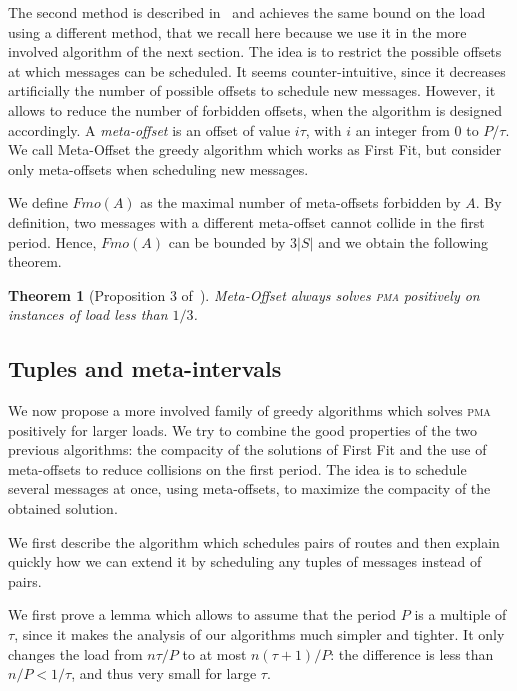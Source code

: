 \documentclass[10pt, conference, letterpaper]{IEEEtran}
\newtheorem{theorem}{Theorem}
\newcommand\pma{\textsc{pma}\xspace}
\begin{document}
The second method is described  in~\cite{dominique2018deterministic} and achieves the same bound on the load using a different method, that we recall here because we use it in the more involved algorithm of the next section.
The idea is to restrict the possible offsets at which messages can be scheduled. It seems counter-intuitive, since it decreases artificially the number of possible offsets to schedule new messages. However, it allows to reduce the number of forbidden offsets, when the algorithm is designed accordingly. A \emph{meta-offset} is an offset of value $i\tau$,
with $i$ an integer from $0$ to $P / \tau$. We call Meta-Offset the greedy algorithm
which works as First Fit, but consider only meta-offsets when scheduling new messages. 

We define $Fmo(A)$ as the maximal number of meta-offsets forbidden by $A$. 
 By definition, two messages with a different meta-offset cannot collide in the first period.
Hence, $Fmo(A)$ can be bounded by $3|S|$ and we obtain the following theorem.


\begin{theorem}[Proposition 3 of~\cite{dominique2018deterministic}]
Meta-Offset always solves \pma positively on instances of load less than $1/3$.
\end{theorem}

\subsection{Tuples and meta-intervals}

We now propose a more involved family of greedy algorithms which 
solves \pma positively for larger loads. We try to combine the good properties of the two previous algorithms: the compacity of the solutions of First Fit and the use of meta-offsets to reduce collisions on the first period. The idea is to schedule several messages at once, using meta-offsets, to maximize the compacity of the obtained solution. 

We first describe the algorithm which schedules pairs of routes and then explain quickly how we can extend it by scheduling any tuples of messages instead of pairs.

We first prove a lemma which allows to assume that the period $P$ is a multiple of $\tau$, since it makes the analysis of our algorithms much simpler and tighter. It only changes the load from $n \tau / P$ to at most $n (\tau +1)/ P$: the difference is less than $n /P < 1/\tau$, and thus very small for large $\tau$.
\end{document}

